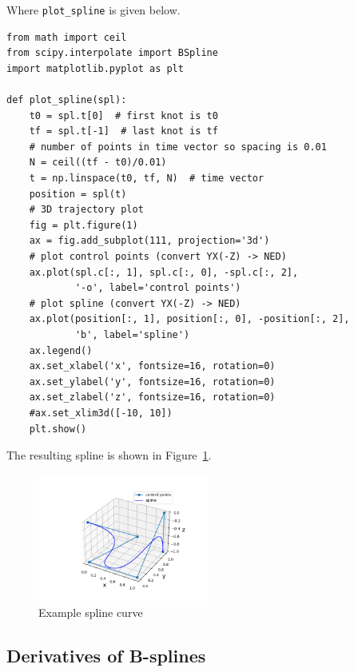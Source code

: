 Where {\tt plot\_spline} is given below.
\begin{lstlisting}
from math import ceil
from scipy.interpolate import BSpline
import matplotlib.pyplot as plt

def plot_spline(spl):
    t0 = spl.t[0]  # first knot is t0
    tf = spl.t[-1]  # last knot is tf
    # number of points in time vector so spacing is 0.01
    N = ceil((tf - t0)/0.01)
    t = np.linspace(t0, tf, N)  # time vector
    position = spl(t)
    # 3D trajectory plot
    fig = plt.figure(1)
    ax = fig.add_subplot(111, projection='3d')
    # plot control points (convert YX(-Z) -> NED)
    ax.plot(spl.c[:, 1], spl.c[:, 0], -spl.c[:, 2],
            '-o', label='control points')
    # plot spline (convert YX(-Z) -> NED)
    ax.plot(position[:, 1], position[:, 0], -position[:, 2],
            'b', label='spline')
    ax.legend()
    ax.set_xlabel('x', fontsize=16, rotation=0)
    ax.set_ylabel('y', fontsize=16, rotation=0)
    ax.set_zlabel('z', fontsize=16, rotation=0)
    #ax.set_xlim3d([-10, 10])
    plt.show()
\end{lstlisting}

The resulting spline is shown in Figure~\ref{fig:example_spline_curve}.
\begin{figure}[hbt]
  \centering\includegraphics[width=0.5\textwidth]{./chap5_trajectory_planning/figures/example_spline_curve}
  \caption{Example spline curve}
  \label{fig:example_spline_curve}  
\end{figure}

\subsection{Derivatives of B-splines}

